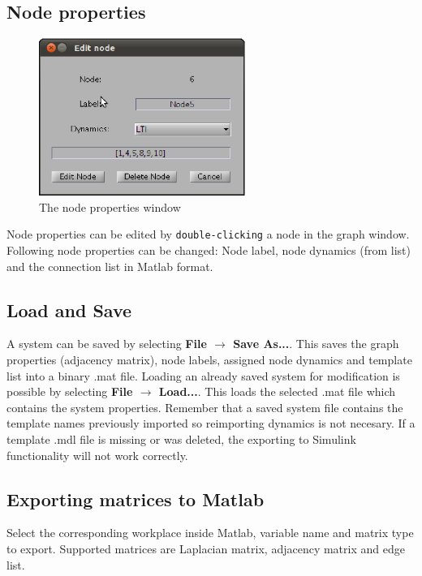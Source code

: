 \documentclass[a4paper,twoside, openright,12pt]{report}
\begin{document}
\subsection{Node properties}
\begin{figure}[h!]
 \centering
 \includegraphics[width=0.6\textwidth]{./pics/Edit_node.eps}
 \caption{The node properties window}
 \label{fig:Edit_Node}
\end{figure}
Node properties can be edited by \verb|double-clicking| a node in the graph window. Following node properties can be changed: Node label, node dynamics (from list) and the connection list in Matlab format.
                                 

\subsection{Load and Save}
A system can be saved by selecting \textbf{File $\rightarrow$ Save As...}. This saves the graph properties (adjacency matrix), node labels, assigned node dynamics and template list into a binary .mat file.
Loading an already saved system for modification is possible by selecting \textbf{File $\rightarrow$ Load...}. This loads the selected .mat file which contains the system properties. \linebreak
Remember that a saved system file contains the template names previously imported so reimporting dynamics is not necesary.
If a template .mdl file is missing or was deleted, the exporting to Simulink functionality will not work correctly.

\subsection{Exporting matrices to Matlab}
Select the corresponding workplace inside Matlab, variable name and matrix type to export.
Supported matrices are Laplacian matrix, adjacency matrix and edge list.
\end{document}
